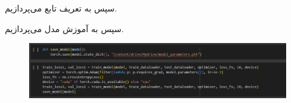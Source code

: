 \documentclass[12pt]{article}
\begin{document}
	سپس به تعریف تابع  می‌پردازیم.
	\begin{figure}[H]
		\centering
		\quad \quad
	\end{figure}
	سپس به آموزش مدل می‌پردازیم.
	\begin{figure}[H]
		\centering
		\includegraphics[width=0.9\linewidth]{pic_14}
	\end{figure}
\end{document}
